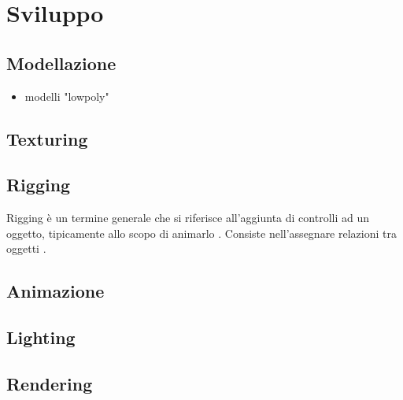 
\chapter{Sviluppo} %

\label{Chapter5} %


\section{Modellazione}
\begin{itemize}
    \item modelli "lowpoly"
\end{itemize}
\section{Texturing}
\section{Rigging}
Rigging è un termine generale che si riferisce all'aggiunta di controlli ad un oggetto, tipicamente allo scopo di animarlo \parencite{blendDoc}.
Consiste nell'assegnare relazioni tra oggetti \parencite{BlendTut}.
\section{Animazione}
\section{Lighting}
\section{Rendering}

